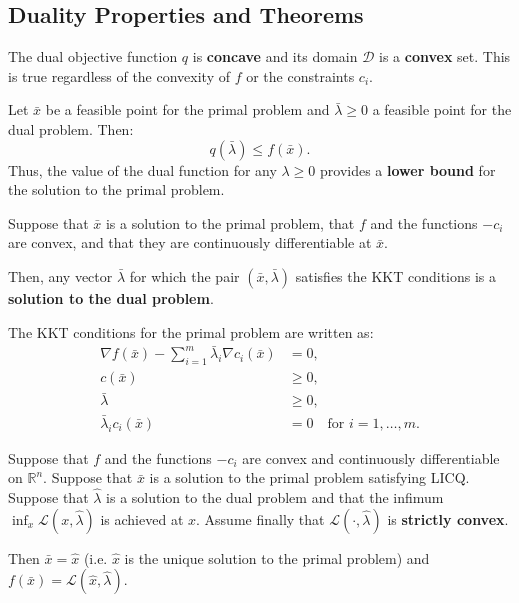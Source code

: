 \subsection{Duality Properties and Theorems}

\begin{theoreme}
    The dual objective function $q$ is \textbf{concave} and its domain $\mathcal{D}$ is a \textbf{convex} set.
    This is true regardless of the convexity of $f$ or the constraints $c_i$.
\end{theoreme}

\begin{theoreme}
    Let $\bar{x}$ be a feasible point for the primal problem and $\bar{\lambda} \geq 0$ a feasible point for the dual problem. Then:
    \begin{equation}
        q(\bar{\lambda}) \leq f(\bar{x}).
    \end{equation}
    Thus, the value of the dual function for any $\lambda \geq 0$ provides a \textbf{lower bound} for the solution to the primal problem.
\end{theoreme}

\begin{theoreme}
    Suppose that $\bar{x}$ is a solution to the primal problem, that $f$ and the functions $-c_i$ are convex, and that they are continuously differentiable at $\bar{x}$.
    
    Then, any vector $\bar{\lambda}$ for which the pair $(\bar{x}, \bar{\lambda})$ satisfies the KKT conditions is a \textbf{solution to the dual problem}.
\end{theoreme}

\begin{remarque}
    The KKT conditions for the primal problem are written as:
    \begin{align*}
        \nabla f(\bar{x}) - \sum_{i=1}^m \bar{\lambda}_i \nabla c_i(\bar{x}) &= 0, \\
        c(\bar{x}) &\geq 0, \\
        \bar{\lambda} &\geq 0, \\
        \bar{\lambda}_i c_i(\bar{x}) &= 0 \quad \text{for } i=1,\dots,m.
    \end{align*}
\end{remarque}

\begin{theoreme}
    Suppose that $f$ and the functions $-c_i$ are convex and continuously differentiable on $\mathbb{R}^n$.
    Suppose that $\bar{x}$ is a solution to the primal problem satisfying LICQ.
    Suppose that $\hat{\lambda}$ is a solution to the dual problem and that the infimum $\inf_x \mathcal{L}(x, \hat{\lambda})$ is achieved at $\hat{x}$.
    Assume finally that $\mathcal{L}(\cdot, \hat{\lambda})$ is \textbf{strictly convex}.
    
    Then $\bar{x} = \hat{x}$ (i.e. $\hat{x}$ is the unique solution to the primal problem) and $f(\bar{x}) = \mathcal{L}(\hat{x}, \hat{\lambda})$.
\end{theoreme}

